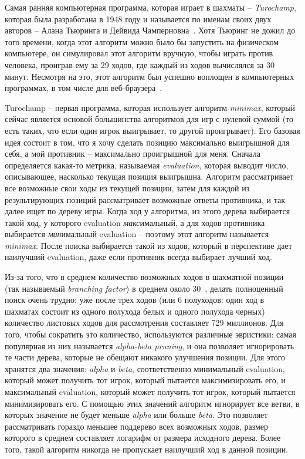 \documentclass{article}
\begin{document}
Самая ранняя компьютерная программа, которая играет в шахматы --
\emph{Turochamp}, которая была разработана в 1948 году 
и называется по именам своих двух авторов -- Алана Тьюринга и Дейвида Чамперновна~\cite{turochamp}.
Хотя Тьюринг не дожил до того времени, когда этот алгоритм можно было бы запустить на физическом компьютере,
он симулировал этот алгоритм вручную, чтобы играть против человека,
проиграв ему за 29 ходов,
где каждый из ходов вычислялся за 30 минут. 
Несмотря на это, этот алгоритм был успешно воплощен в компьютерных программах,
в том числе для веб-браузера~\cite{nimturochamp}.


Turochamp -- первая программа, которая использует алгоритм \emph{minimax},
который сейчас является основой большинства алгоритмов для игр с нулевой суммой
(то есть таких, что если один игрок выигрывает, то другой проигрывает).
Его базовая идея состоит в том,
что я хочу сделать позицию максимально выигрышной для себя,
а мой противник -- максимально проигрышной для меня.
Сначала определяется какая-то метрика, называемая \emph{evaluation},
которая выводит число, описывающее, насколько текущая позиция выигрышна.
Алгоритм рассматривает все возможные свои ходы из текущей позиции,
затем для каждой из результирующих позиций рассматривает возможные ответы противника,
и так далее ищет по дереву игры.
Когда ход у алгоритма, из этого дерева выбирается такой ход,
у которого evaluation \emph{макс}имальный,
а для ходов противника выбирается \emph{мин}имальный evaluation --
поэтому этот алгоритм называется \emph{minimax}.
После поиска выбирается такой из ходов,
который в перспективе дает наилучший evaluation,
даже если противник всегда выбирает лучший ход.

Из-за того, что в среднем количество возможных ходов в шахматной позиции
(так называемый \emph{branching factor})
в среднем около 30~\cite{chess-se-branching-factor},
делать полноценный поиск очень трудно:
уже после трех ходов (или 6 полуходов: один ход в шахматах состоит из одного полухода белых и одного полухода черных)
количество листовых ходов для рассмотрения составляет 729 миллионов.
Для того, чтобы сократить это количество,
используются различные эвристики: самая популярная из них называется \emph{alpha-beta pruning},
и она позволяет игнорировать те части дерева, которые не обещают никакого улучшения позиции.
Для этого хранятся два значения: \emph{alpha} и \emph{beta},
соответственно минимальный evaluation, который может получить тот игрок, который пытается максимизировать его,
и максимальный evaluation, который может получить тот игрок, который пытается минимизировать его.
С помощью этих значений алгоритм игнорирует все ветви,
в которых значение не будет меньше \emph{alpha} или больше \emph{beta}.
Это позволяет рассматривать гораздо меньшее поддерево всех возможных ходов,
размер которого в среднем составляет логарифм от размера исходного дерева.
Более того, такой алгоритм никогда не пропускает наилучший ход в данной позиции.
\end{document}
